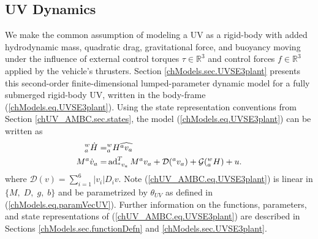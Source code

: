 \subsection{\ac{UV} Dynamics}
\label{chUV_AMBC.sec.UV_dynamics}

We make the common assumption of modeling a \ac{UV} as a rigid-body with
added hydrodynamic mass, quadratic drag, gravitational force, and
buoyancy moving under the influence of external control torques $\tau
\in \mathbb{R}^{3}$ and control forces $f \in \mathbb{R}^{3}$ applied
by the vehicle's thrusters. Section \ref{chModels.sec.UVSE3plant}
presents this second-order finite-dimensional lumped-parameter dynamic
model for a fully submerged rigid-body \ac{UV}, written in the
body-frame (\ref{chModels.eq.UVSE3plant}).  Using the state
representation conventions from Section \ref{chUV_AMBC.sec.states},
the model (\ref{chModels.eq.UVSE3plant}) can be written as
%
\begin{align} \label{chUV_AMBC.eq.UVSE3plant}
{^w_a}\dot{H}=&{^w_a}H \widehat{{^a}v_a}
\nonumber \\
  M{^a}\dot{v}_a=&\operatorname{ad}_{{^a}v_a}^T M {^a}v_a+\mathcal{D}({^a}v_a)+\mathcal{G}({^w_a}H)+u.
\end{align}
%
\noindent where $\mathcal{D}(v)=\sum_{i=1}^6 |v_i|D_i v$.  Note
(\ref{chUV_AMBC.eq.UVSE3plant}) is linear in $\{M,\;D,\;g,\;b\}$ and
be parametrized by $\theta_{UV}$ as defined in
(\ref{chModels.eq.paramVecUV}). Further information on the functions,
parameters, and state representations of (\ref{chUV_AMBC.eq.UVSE3plant})
are described in Sections \ref{chModels.sec.functionDefn} and
\ref{chModels.sec.UVSE3plant}.
 

